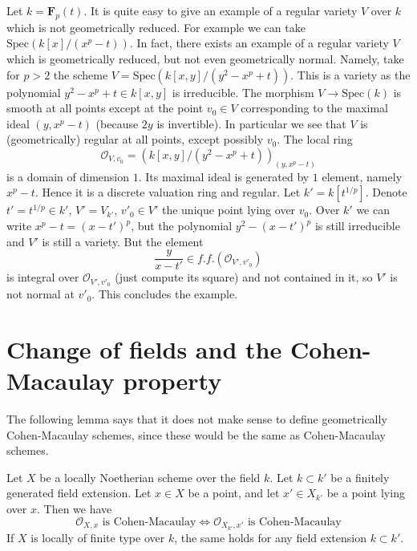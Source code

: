 \begin{example}
\label{example-geometrically-reduced-not-normal}
Let $k =\mathbf{F}_p(t)$. It is quite easy to give an example of a regular
variety $V$ over $k$ which is not geometrically reduced. For example we
can take $\text{Spec}(k[x]/(x^p - t))$. In fact, there exists an
example of a regular variety $V$ which is geometrically reduced, but
not even geometrically normal. Namely, take for $p > 2$ the scheme
$V = \text{Spec}(k[x, y]/(y^2 - x^p + t))$. This is a variety as the
polynomial $y^2 - x^p + t \in k[x, y]$ is irreducible.
The morphism $V \to \text{Spec}(k)$ is smooth at all points
except at the point $v_0 \in V$ corresponding to the maximal ideal
$(y, x^p - t)$ (because $2y$ is invertible). In particular we see that
$V$ is (geometrically) regular at all points, except possibly $v_0$.
The local ring
$$
\mathcal{O}_{V, v_0} = \left(k[x, y]/(y^2 - x^p + t)\right)_{(y, x^p - t)}
$$
is a domain of dimension $1$. Its maximal ideal is generated by $1$ element,
namely $x^p - t$. Hence it is a discrete valuation ring and regular.
Let $k' = k[t^{1/p}]$. Denote $t' = t^{1/p} \in k'$,
$V' = V_{k'}$, $v'_0 \in V'$ the unique point lying over $v_0$.
Over $k'$ we can write $x^p - t = (x - t')^p$, but the polynomial
$y^2 - (x - t')^p$ is still irreducible and $V'$ is still a variety.
But the element
$$
\frac{y}{x - t'} \in f.f.(\mathcal{O}_{V', v'_0})
$$
is integral over $\mathcal{O}_{V', v'_0}$ (just compute its square)
and not contained in it, so $V'$ is not normal at $v'_0$. This concludes
the example.
\end{example}







\section{Change of fields and the Cohen-Macaulay property}
\label{section-CM}

\noindent
The following lemma says that it does not make sense to define
geometrically Cohen-Macaulay schemes, since these would be the
same as Cohen-Macaulay schemes.

\begin{lemma}
\label{lemma-CM-base-change}
Let $X$ be a locally Noetherian scheme over the field $k$.
Let $k \subset k'$ be a finitely generated field extension.
Let $x \in X$ be a point, and let $x' \in X_{k'}$ be a point lying
over $x$. Then we have
$$
\mathcal{O}_{X, x}\text{ is Cohen-Macaulay}
\Leftrightarrow
\mathcal{O}_{X_{k'}, x'}\text{ is Cohen-Macaulay}
$$
If $X$ is locally of finite type over $k$, the same holds for any
field extension $k \subset k'$.
\end{lemma}

